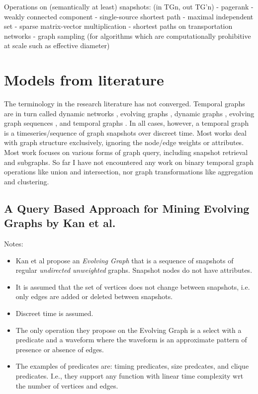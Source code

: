Operations on (semantically at least) snapshots: (in TGn, out TG'n)
 - pagerank
 - weakly connected component
 - single-source shortest path
 - maximal independent set
 - sparse matrix-vector multiplication
 - shortest paths on transportation networks
 - graph sampling (for algorithms which are computationally prohibitive at scale such as effective diameter)

\section{Models from literature}

The terminology in the research literature has not converged. Temporal graphs are in turn called dynamic networks \cite{Lerman2010,Jin2007,Lahiri2008}, evolving graphs \cite{Kan2009,Chan2008,Han2014,Aggarwal2010}, dynamic graphs \cite{Vaquero2014,Borgwardt2006}, evolving graph sequences \cite{Ren2011}, and temporal graphs \cite{Wu2014}.  In all cases, however, a temporal graph is a timeseries/sequence of graph snapshots over discreet time. Most works deal with graph structure exclusively, ignoring the node/edge weights or attributes. Most work focuses on various forms of graph query, including snapshot retrieval and subgraphs. So far I have not encountered any work on binary temporal graph operations like union and intersection, nor graph transformations like aggregation and clustering.

\subsection{A Query Based Approach for Mining Evolving Graphs by Kan et al. \cite{Kan2009}}

Notes:
\begin{itemize}

\item Kan et al propose an {\em Evolving Graph} that is a sequence of snapshots of regular {\em undirected unweighted} graphs. Snapshot nodes do not have attributes.
\item It is assumed that the set of vertices does not change between snapshots, i.e. only edges are added or deleted between snapshots.
\item Discreet time is assumed.
\item The only operation they propose on the Evolving Graph is a select with a predicate and a waveform where the waveform is an approximate pattern of presence or absence of edges.
\item The examples of predicates are: timing predicates, size predcates, and clique predicates. I.e., they support any function with linear time complexity wrt the number of vertices and edges.

\end{itemize}

